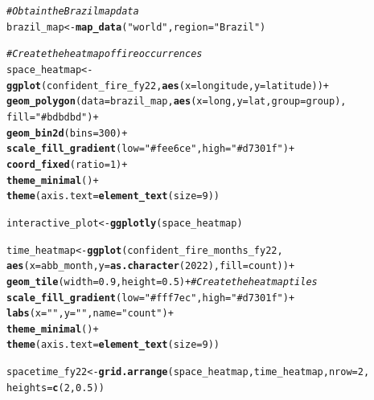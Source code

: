 \documentclass{article}\usepackage[]{graphicx}\usepackage[]{xcolor}
\makeatletter
\newcommand{\hlnum}[1]{\textcolor[rgb]{0.686,0.059,0.569}{#1}}%
\newcommand{\hlstr}[1]{\textcolor[rgb]{0.192,0.494,0.8}{#1}}%
\newcommand{\hlcom}[1]{\textcolor[rgb]{0.678,0.584,0.686}{\textit{#1}}}%
\newcommand{\hlopt}[1]{\textcolor[rgb]{0,0,0}{#1}}%
\newcommand{\hlstd}[1]{\textcolor[rgb]{0.345,0.345,0.345}{#1}}%
\newcommand{\hlkwb}[1]{\textcolor[rgb]{0.69,0.353,0.396}{#1}}%
\newcommand{\hlkwc}[1]{\textcolor[rgb]{0.333,0.667,0.333}{#1}}%
\newcommand{\hlkwd}[1]{\textcolor[rgb]{0.737,0.353,0.396}{\textbf{#1}}}%
\newenvironment{kframe}{%
 \def\at@end@of@kframe{}%
 \ifinner\ifhmode%
  \def\at@end@of@kframe{\end{minipage}}%
  \begin{minipage}{\columnwidth}%
 \fi\fi%
 \def\FrameCommand##1{\hskip\@totalleftmargin \hskip-\fboxsep
 \colorbox{shadecolor}{##1}\hskip-\fboxsep
     \hskip-\linewidth \hskip-\@totalleftmargin \hskip\columnwidth}%
 \MakeFramed {\advance\hsize-\width
   \@totalleftmargin\z@ \linewidth\hsize
   \@setminipage}}%
 {\par\unskip\endMakeFramed%
 \at@end@of@kframe}
\newenvironment{knitrout}{}{} %
\makeatother
\begin{document}
\begin{knitrout}
\color{fgcolor}\begin{kframe}
\begin{alltt}
\hlcom{# Obtain the Brazil map data}
\hlstd{brazil_map} \hlkwb{<-} \hlkwd{map_data}\hlstd{(}\hlstr{"world"}\hlstd{,} \hlkwc{region} \hlstd{=} \hlstr{"Brazil"}\hlstd{)}

\hlcom{# Create the heatmap of fire occurrences}
\hlstd{space_heatmap} \hlkwb{<-} \hlkwd{ggplot}\hlstd{(confident_fire_fy22,} \hlkwd{aes}\hlstd{(}\hlkwc{x} \hlstd{= longitude,} \hlkwc{y} \hlstd{= latitude))} \hlopt{+}
  \hlkwd{geom_polygon}\hlstd{(}\hlkwc{data} \hlstd{= brazil_map,} \hlkwd{aes}\hlstd{(}\hlkwc{x} \hlstd{= long,} \hlkwc{y} \hlstd{= lat,} \hlkwc{group} \hlstd{= group),}
               \hlkwc{fill} \hlstd{=} \hlstr{"#bdbdbd"}\hlstd{)} \hlopt{+}
  \hlkwd{geom_bin2d}\hlstd{(}\hlkwc{bins} \hlstd{=} \hlnum{300}\hlstd{)} \hlopt{+}
  \hlkwd{scale_fill_gradient}\hlstd{(}\hlkwc{low} \hlstd{=} \hlstr{"#fee6ce"}\hlstd{,} \hlkwc{high} \hlstd{=} \hlstr{"#d7301f"}\hlstd{)} \hlopt{+}
  \hlkwd{coord_fixed}\hlstd{(}\hlkwc{ratio} \hlstd{=} \hlnum{1}\hlstd{)} \hlopt{+}
  \hlkwd{theme_minimal}\hlstd{()}\hlopt{+}
  \hlkwd{theme}\hlstd{(}\hlkwc{axis.text} \hlstd{=} \hlkwd{element_text}\hlstd{(}\hlkwc{size} \hlstd{=} \hlnum{9}\hlstd{))}

\hlstd{interactive_plot} \hlkwb{<-} \hlkwd{ggplotly}\hlstd{(space_heatmap)}

\hlstd{time_heatmap} \hlkwb{<-} \hlkwd{ggplot}\hlstd{(confident_fire_months_fy22,}
                       \hlkwd{aes}\hlstd{(}\hlkwc{x} \hlstd{= abb_month,} \hlkwc{y} \hlstd{=} \hlkwd{as.character}\hlstd{(}\hlnum{2022}\hlstd{),} \hlkwc{fill} \hlstd{= count))} \hlopt{+}
  \hlkwd{geom_tile}\hlstd{(}\hlkwc{width} \hlstd{=} \hlnum{0.9}\hlstd{,} \hlkwc{height} \hlstd{=} \hlnum{0.5}\hlstd{)} \hlopt{+}  \hlcom{# Create the heatmap tiles}
  \hlkwd{scale_fill_gradient}\hlstd{(}\hlkwc{low} \hlstd{=} \hlstr{"#fff7ec"}\hlstd{,} \hlkwc{high} \hlstd{=} \hlstr{"#d7301f"}\hlstd{)} \hlopt{+}
  \hlkwd{labs}\hlstd{(}\hlkwc{x} \hlstd{=} \hlstr{" "}\hlstd{,} \hlkwc{y} \hlstd{=} \hlstr{" "}\hlstd{,} \hlkwc{name} \hlstd{=} \hlstr{"count"}\hlstd{)} \hlopt{+}
  \hlkwd{theme_minimal}\hlstd{()} \hlopt{+}
  \hlkwd{theme}\hlstd{(}\hlkwc{axis.text} \hlstd{=} \hlkwd{element_text}\hlstd{(}\hlkwc{size} \hlstd{=} \hlnum{9}\hlstd{))}

\hlstd{spacetime_fy22} \hlkwb{<-} \hlkwd{grid.arrange}\hlstd{(space_heatmap, time_heatmap,} \hlkwc{nrow} \hlstd{=} \hlnum{2}\hlstd{,}
                               \hlkwc{heights} \hlstd{=} \hlkwd{c}\hlstd{(}\hlnum{2}\hlstd{,}\hlnum{0.5}\hlstd{))}


\end{alltt}
\end{kframe}
\end{knitrout}
\end{document}

